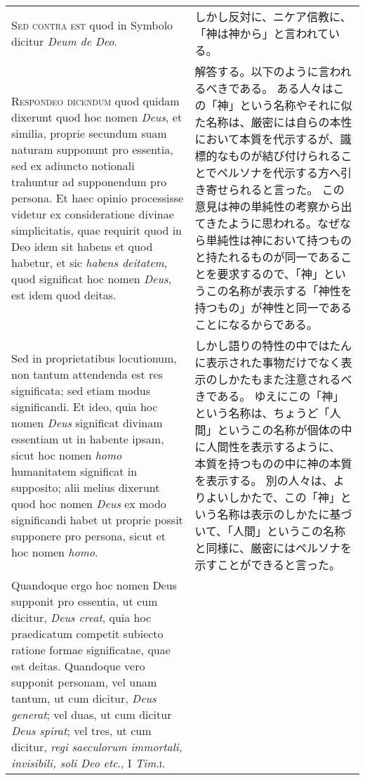 \documentclass[10pt]{jsarticle} %
\begin{document}
\begin{longtable}{p{21em}p{21em}}
{\scshape Sed contra est} quod in Symbolo dicitur {\itshape Deum de Deo}.

&

しかし反対に、ニケア信教に、「神は神から」と言われている。

\\



{\scshape Respondeo dicendum} quod quidam dixerunt quod hoc nomen \textit{Deus}, et similia,
proprie secundum suam naturam supponunt pro essentia, sed ex adiuncto
notionali trahuntur ad supponendum pro persona. Et haec opinio
processisse videtur ex consideratione divinae simplicitatis, quae
requirit quod in Deo idem sit habens et quod habetur, et sic \textit{habens
deitatem}, quod significat hoc nomen \textit{Deus}, est idem quod deitas. 


&

解答する。以下のように言われるべきである。
ある人々はこの「神」という名称やそれに似た名称は、厳密には自らの本性において本質を代示するが、識標的なものが結び付けられることでペルソナを代示する方へ引き寄せられると言った。
この意見は神の単純性の考察から出てきたように思われる。なぜなら単純性は神において持つものと持たれるものが同一であることを要求するので、「神」というこの名称が表示する「神性を持つもの」が神性と同一であることになるからである。



\\


Sed in
proprietatibus locutionum, non tantum attendenda est res significata;
sed etiam modus significandi. Et ideo, quia hoc nomen \textit{Deus} significat
divinam essentiam ut in habente ipsam, sicut hoc nomen \textit{homo} humanitatem
significat in supposito; alii melius dixerunt quod hoc nomen \textit{Deus} ex
modo significandi habet ut proprie possit supponere pro persona, sicut
et hoc nomen \textit{homo}. 


&

しかし語りの特性の中ではたんに表示された事物だけでなく表示のしかたもまた注意されるべきである。
ゆえにこの「神」という名称は、ちょうど「人間」というこの名称が個体の中に人間性を表示するように、
本質を持つものの中に神の本質を表示する。
別の人々は、よりよいしかたで、この「神」という名称は表示のしかたに基づいて、「人間」というこの名称と同様に、厳密にはペルソナを示すことができると言った。

\\


Quandoque ergo hoc nomen Deus supponit pro essentia,
ut cum dicitur, \textit{Deus creat}, quia hoc praedicatum competit subiecto
ratione formae significatae, quae est deitas. Quandoque vero supponit
personam, vel unam tantum, ut cum dicitur, \textit{Deus generat}; vel duas, ut
cum dicitur \textit{Deus spirat}; vel tres, ut cum dicitur, \textit{regi saeculorum
immortali, invisibili, soli Deo etc}., I \textit{Tim}.\textsc{i}.


\end{longtable}
\end{document}
